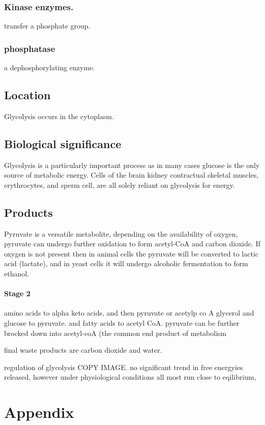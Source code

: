 \documentclass[]{article}
\let\oldparagraph\paragraph
\renewcommand{\paragraph}[1]{\oldparagraph{#1}\mbox{}}
\begin{document}
\hypertarget{kinase-enzymes.}{%
\subsubsection{Kinase enzymes.}\label{kinase-enzymes.}}

transfer a phosphate group.

\hypertarget{phosphatase}{%
\subsubsection{phosphatase}\label{phosphatase}}

a dephosphorylating enzyme.

\hypertarget{location}{%
\subsection{Location}\label{location}}

Glycolysis occurs in the cytoplasm.

\hypertarget{biological-significance}{%
\subsection{Biological significance}\label{biological-significance}}

Glycolysis is a particularly important process as in many cases glucose
is the only source of metabolic energy. Cells of the brain kidney
contractual skeletal muscles, erythrocytes, and sperm cell, are all
solely reliant on glycolysis for energy.

\hypertarget{products}{%
\subsection{Products}\label{products}}

Pyruvate is a versatile metabolite, depending on the availability of
oxygen, pyruvate can undergo further oxidation to form acetyl-CoA and
carbon dioxide. If oxygen is not present then in animal cells the
pyruvate will be converted to lactic acid (lactate), and in yeast cells
it will undergo alcoholic fermentation to form ethanol.

\hypertarget{stage-2}{%
\paragraph{Stage 2}\label{stage-2}}

amino acids to alpha keto acids, and then pyruvate or acetylp co A
glycerol and glucose to pyruvate. and fatty acids to acetyl CoA.
pyruvate can be further brocked down into acetyl-coA (the common end
product of metabolism

final waste products are carbon dioxide and water.

regulation of glycolysis COPY IMAGE. no significant trend in free
energyies released, however under physiological conditions all most run
close to eqilibrium,

\hypertarget{appendix}{%
\section{Appendix}\label{appendix}}
\end{document}
